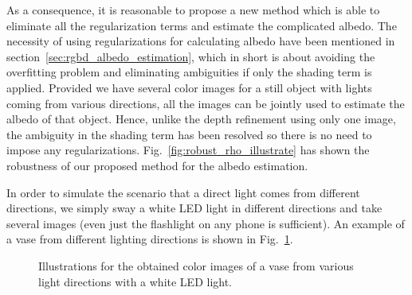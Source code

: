 As a consequence, it is reasonable to propose a new method which is able to eliminate all the regularization terms and estimate the complicated albedo.
The necessity of using regularizations for calculating albedo have been mentioned in section~\ref{sec:rgbd_albedo_estimation}, which in short is about avoiding the overfitting problem and eliminating ambiguities if only the shading term is applied.
Provided we have several color images for a still object with lights coming from various directions, all the images can be jointly used to estimate the albedo of that object.
Hence, unlike the depth refinement using only one image, the ambiguity in the shading term has been resolved so there is no need to impose any regularizations.
Fig.~\ref{fig:robust_rho_illustrate} has shown the robustness of our proposed method for the albedo estimation.

In order to simulate the scenario that a direct light comes from different directions, we simply sway a white LED light in different directions and take several images (even just the flashlight on any phone is sufficient). An example of a vase from different lighting directions is shown in Fig.~\ref{fig:robust_setup}.

\begin{figure}[!htbp]
\centering
{}
\caption{Illustrations for the obtained color images of a vase from various light directions with a white LED light.}
\label{fig:robust_setup}
\end{figure}

